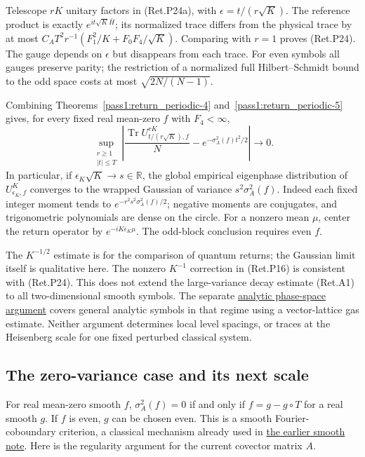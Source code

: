 Telescope \(rK\) unitary factors in (Ret.P24a), with
\(\epsilon=t/(r\sqrt K)\). The reference product is exactly
\(e^{it\sqrt K\bar H}\); its normalized trace differs from the physical
trace by at most
\(C_AT^2r^{-1}(F_1^2/K+F_0F_4/\sqrt K)\).
Comparing with \(r=1\) proves (Ret.P24). The gauge depends on \(\epsilon\)
but disappears from each trace.
For even symbols all gauges preserve parity; the restriction of a
normalized full Hilbert--Schmidt bound to the odd space costs at most
\(\sqrt{2N/(N-1)}\).

Combining Theorems~\ref{pass1:return_periodic-4} and~\ref{pass1:return_periodic-5} gives, for every fixed real mean-zero \(f\)
with \(F_4<\infty\),
\[
 \sup_{\substack{r\ge1\\|t|\le T}}
 \left|\frac{\operatorname{Tr}U_{t/(r\sqrt K),f}^{rK}}N
                    -e^{-\sigma_A^2(f)t^2/2}\right|\to0.    \tag{Ret.P25}
\]
In particular, if \(\epsilon_K\sqrt K\to s\in\mathbb R\), the global
empirical eigenphase distribution of \(U_{\epsilon_K,f}^K\) converges to
the wrapped Gaussian of variance \(s^2\sigma_A^2(f)\). Indeed each fixed
integer moment tends to \(e^{-r^2s^2\sigma_A^2(f)/2}\); negative moments
are conjugates, and trigonometric polynomials are dense on the circle.
For a nonzero mean \(\mu\), center the return operator by
\(e^{-iK\epsilon_K\mu}\). The odd-block conclusion requires even \(f\).

The \(K^{-1/2}\) estimate is for the comparison of quantum returns;
the Gaussian limit itself is qualitative here.
The nonzero \(K^{-1}\) correction in (Ret.P16) is consistent with (Ret.P24).
This does not extend the large-variance decay estimate (Ret.A1) to all
two-dimensional smooth symbols. The separate
\href{https://github.com/ChurilovMaksim/BGS/blob/main/mathematics/returns/phase_space_return_gas.md}{analytic phase-space argument} covers
general analytic symbols in that regime using a vector-lattice gas
estimate. Neither argument determines local level
spacings, or traces at the Heisenberg scale for one fixed perturbed
classical system.

\hypertarget{the-zero-variance-case-and-its-next-scale}{%
\subsection{The zero-variance case and its next scale}\label{the-zero-variance-case-and-its-next-scale}}

\begin{theorem}\label{pass1:return_periodic-6} For real mean-zero smooth \(f\),
\(\sigma_A^2(f)=0\) if and only if \(f=g-g\circ T\) for a real smooth \(g\).
If \(f\) is even, \(g\) can be chosen even.
This is a smooth Fourier-coboundary criterion, a classical mechanism
already used in \href{https://github.com/ChurilovMaksim/BGS/blob/main/mathematics/pell/pell_smooth_resonance.md}{the earlier smooth note}.
Here is the regularity argument for the current covector matrix \(A\).
\end{theorem}

